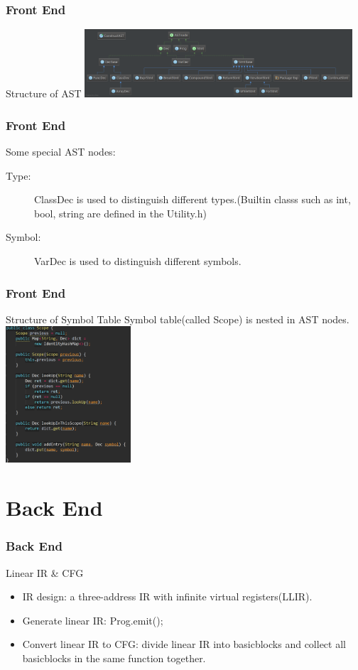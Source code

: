 \documentclass{beamer}
\begin{document}
	\begin{frame}
		\frametitle{Front End}
		\begin{block}{Structure of AST}
		\centering
		\includegraphics[height = 1in]{AST.png}
		\end{block}
	\end{frame}

	\begin{frame}
		\frametitle{Front End}
		\begin{block}{Some special AST nodes:}
		\begin{description}
			\item[Type:] 
			ClassDec is used to distinguish different types.(Builtin classs such as int, bool, string are defined in the Utility.h)
			\item[Symbol:]
			VarDec is used to distinguish different symbols.
		\end{description}
		\end{block}
	\end{frame}

	\begin{frame}
		\frametitle{Front End}
		\begin{block}{Structure of Symbol Table}
			Symbol table(called Scope) is nested in AST nodes. 
			\centering
			\includegraphics[height = 2in]{scope.png}
		\end{block}
	\end{frame}

	\section{Back End} %
	\label{sec:back_end}
	
	\begin{frame}
		\frametitle{Back End}
		\begin{block}{Linear IR \& CFG}
		\begin{itemize}
			\item
			IR design: a three-address IR with infinite virtual registers(LLIR).
			\item 
			Generate linear IR: Prog.emit();
			\item
			Convert linear IR to CFG: divide linear IR into basicblocks and collect all basicblocks in the same function together.
		\end{itemize}
		\end{block}
	\end{frame}
\end{document}
